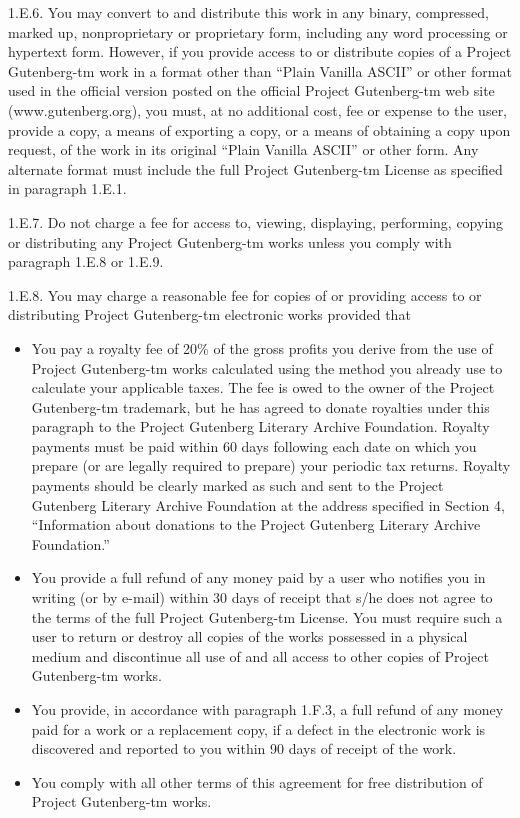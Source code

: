 \documentclass[12pt,oneside]{scrbook}
\begin{document}
  1.E.6. You may convert to and distribute this work in any binary,
  compressed, marked up, nonproprietary or proprietary form, including any
  word processing or hypertext form. However, if you provide access to or
  distribute copies of a Project Gutenberg-tm work in a format other than
  ``Plain Vanilla ASCII'' or other format used in the official version
  posted on the official Project Gutenberg-tm web site
  (www.gutenberg.org), you must, at no additional cost, fee or expense to
  the user, provide a copy, a means of exporting a copy, or a means of
  obtaining a copy upon request, of the work in its original ``Plain
  Vanilla ASCII'' or other form. Any alternate format must include the
  full Project Gutenberg-tm License as specified in paragraph 1.E.1.
  
  1.E.7. Do not charge a fee for access to, viewing, displaying,
  performing, copying or distributing any Project Gutenberg-tm works
  unless you comply with paragraph 1.E.8 or 1.E.9.
  
  1.E.8. You may charge a reasonable fee for copies of or providing access
  to or distributing Project Gutenberg-tm electronic works provided that
  
  \begin{itemize}
  \item
    You pay a royalty fee of 20\% of the gross profits you derive from the
    use of Project Gutenberg-tm works calculated using the method you
    already use to calculate your applicable taxes. The fee is owed to the
    owner of the Project Gutenberg-tm trademark, but he has agreed to
    donate royalties under this paragraph to the Project Gutenberg
    Literary Archive Foundation. Royalty payments must be paid within 60
    days following each date on which you prepare (or are legally required
    to prepare) your periodic tax returns. Royalty payments should be
    clearly marked as such and sent to the Project Gutenberg Literary
    Archive Foundation at the address specified in Section 4,
    ``Information about donations to the Project Gutenberg Literary
    Archive Foundation.''
  \item
    You provide a full refund of any money paid by a user who notifies you
    in writing (or by e-mail) within 30 days of receipt that s/he does not
    agree to the terms of the full Project Gutenberg-tm License. You must
    require such a user to return or destroy all copies of the works
    possessed in a physical medium and discontinue all use of and all
    access to other copies of Project Gutenberg-tm works.
  \item
    You provide, in accordance with paragraph 1.F.3, a full refund of any
    money paid for a work or a replacement copy, if a defect in the
    electronic work is discovered and reported to you within 90 days of
    receipt of the work.
  \item
    You comply with all other terms of this agreement for free
    distribution of Project Gutenberg-tm works.
  \end{itemize}
  
\end{document}
